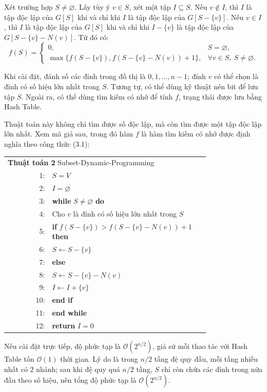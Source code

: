 \documentclass[11pt]{article}
\newcommand{\Oh}{\mathcal{O}}
\begin{document}
Xét trường hợp \(S\ne\varnothing\). Lấy tùy ý \(v\in S\), xét một tập
\(I\subseteq S\). Nếu \(v\notin I\), thì \(I\) là tập độc lập của \(G[S]\) khi
và chỉ khi \(I\) là tập độc lập của \(G[S-\{v\}]\). Nếu \(v\in I\), thì \(I\)
là tập độc lập của \(G[S]\) khi và chỉ khi \(I-\{v\}\) là tập độc lập của
\(G[S-\{v\}-N(v)]\). Từ đó có:
\[
  f(S)=
  \begin{cases}
    0, & S=\varnothing,\\
    \max\{f(S-\{v\}),f(S-\{v\}-N(v))+1\},
      & \forall v\in S,\ S\ne\varnothing.
  \end{cases}
  \tag{3.1}
\]

Khi cài đặt, đánh số các đỉnh trong đồ thị là \(0,1,\ldots,n-1\); đỉnh \(v\)
có thể chọn là đỉnh có số hiệu lớn nhất trong \(S\). Tương tự, có thể dùng kỹ
thuật nén bit để lưu tập \(S\). Ngoài ra, có thể dùng tìm kiếm có nhớ để tính
\(f\), trạng thái được lưu bằng Hash Table.

Thuật toán này không chỉ tìm được số độc lập, mà còn tìm được một tập độc lập
lớn nhất. Xem mã giả sau, trong đó hàm \(f\) là hàm tìm kiếm có nhớ được định
nghĩa theo công thức (3.1):

\begin{center}
\small
\begin{tabular}{r@{\quad}p{0.78\linewidth}}
\multicolumn{2}{l}{\textbf{Thuật toán 2} Subset-Dynamic-Programming}\\
1: & \(S=V\)\\
2: & \(I=\varnothing\)\\
3: & \textbf{while} \(S\ne\varnothing\) \textbf{do}\\
4: & \quad Cho \(v\) là đỉnh có số hiệu lớn nhất trong \(S\)\\
5: & \quad \textbf{if} \(f(S-\{v\})>f(S-\{v\}-N(v))+1\) \textbf{then}\\
6: & \qquad \(S\gets S-\{v\}\)\\
7: & \quad \textbf{else}\\
8: & \qquad \(S\gets S-\{v\}-N(v)\)\\
9: & \qquad \(I\gets I+\{v\}\)\\
10: & \quad \textbf{end if}\\
11: & \textbf{end while}\\
12: & \textbf{return} \(I=0\)
\end{tabular}
\end{center}

Nếu cài đặt trực tiếp, độ phức tạp là \(\Oh(2^{n/2})\), giả sử mỗi thao tác với
Hash Table tốn \(\Oh(1)\) thời gian. Lý do là trong \(n/2\) tầng đệ quy đầu,
mỗi tầng nhiều nhất có \(2\) nhánh; sau khi đệ quy quá \(n/2\) tầng, \(S\) chỉ
còn chứa các đỉnh trong nửa đầu theo số hiệu, nên tổng độ phức tạp là
\(\Oh(2^{n/2})\).
\end{document}
